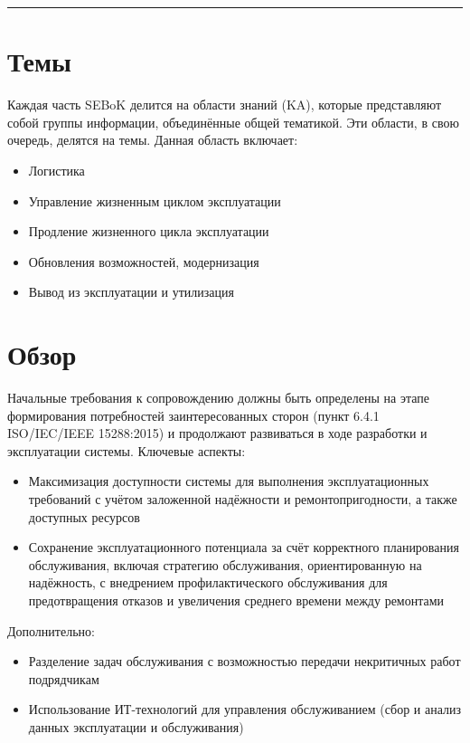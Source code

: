 \documentclass[14pt,a4paper]{extarticle}
\begin{document}
\hrule

\section{Темы}

Каждая часть SEBoK делится на области знаний (KA), которые представляют собой группы информации, объединённые общей тематикой. Эти области, в свою очередь, делятся на темы. Данная область включает:

\begin{itemize}
\item Логистика
\item Управление жизненным циклом эксплуатации
\item Продление жизненного цикла эксплуатации
\item Обновления возможностей, модернизация
\item Вывод из эксплуатации и утилизация
\end{itemize}

\section{Обзор}

Начальные требования к сопровождению должны быть определены на этапе формирования потребностей заинтересованных сторон (пункт 6.4.1 ISO/IEC/IEEE 15288:2015) и продолжают развиваться в ходе разработки и эксплуатации системы. Ключевые аспекты:

\begin{itemize}
\item Максимизация доступности системы для выполнения эксплуатационных требований с учётом заложенной надёжности и ремонтопригодности, а также доступных ресурсов
\item Сохранение эксплуатационного потенциала за счёт корректного планирования обслуживания, включая стратегию обслуживания, ориентированную на надёжность, с внедрением профилактического обслуживания для предотвращения отказов и увеличения среднего времени между ремонтами
\end{itemize}

Дополнительно:

\begin{itemize}
\item Разделение задач обслуживания с возможностью передачи некритичных работ подрядчикам
\item Использование ИТ-технологий для управления обслуживанием (сбор и анализ данных эксплуатации и обслуживания)
\end{itemize}
\end{document}
